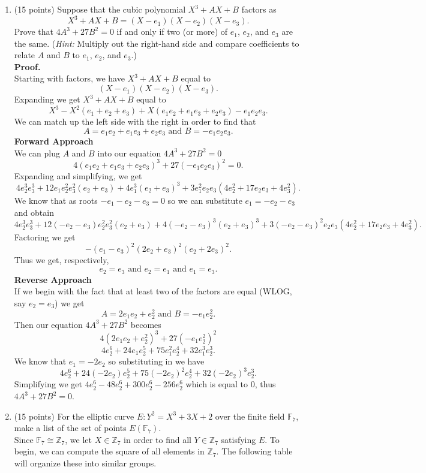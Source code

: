 \documentclass[12pt]{article}
\begin{document}
\begin{enumerate}
\item (15 points)
Suppose that the cubic polynomial $X^3+AX+B$ factors as 
\[X^3+AX+B=(X-e_1)(X-e_2)(X-e_3).\]
Prove that $4A^3+27B^2=0$ if and only if  two (or more) of $e_1$, $e_2$, and $e_3$ are the same. (\emph{Hint:} Multiply out the right-hand side and compare coefficients to relate $A$ and $B$ to $e_1$, $e_2$, and $e_3$.)\\

\textbf{Proof.}\\
Starting with factors, we have $X^3+AX+B$ equal to \[(X-e_1)(X-e_2)(X-e_3).\]
Expanding we get $X^3+AX+B$ equal to \[X^3-X^2(e_1 + e_2 +e_3)+X(e_1e_2+e_1e_3+e_2e_3)-e_1e_2e_3.\]
We can match up the left side with the right in order to find that \[A = e_1e_2+e_1e_3+e_2e_3 \text{ and } B = -e_1e_2e_3.\]
\textbf{Forward Approach}\\
We can plug $A$ and $B$ into our equation $4A^3+27B^2=0$\[4(e_1e_2+e_1e_3+e_2e_3)^3+27(-e_1e_2e_3)^2=0.\] 
Expanding and simplifying, we get \[4e_2^3e_3^3 + 12e_1e_2^2e_3^2(e_2 + e_3) + 4e_1^3(e_2 + e_3)^3 + 3e_1^2e_2e_3(4e_2^2 + 17e_2e_3 + 4e_3^2).\] 
We know that as roots $-e_1-e_2-e_3=0$ so we can substitute $e_1=-e_2-e_3$ and obtain \[4e_2^3e_3^3 + 12(-e_2-e_3)e_2^2e_3^2(e_2 + e_3) + 4(-e_2-e_3)^3(e_2 + e_3)^3 + 3(-e_2-e_3)^2e_2e_3(4e_2^2 + 17e_2e_3 + 4e_3^2).\]
Factoring we get \[-(e_1-e_3)^2(2e_2+e_3)^2(e_2+2e_3)^2.\]
Thus we get, respectively, \[e_2=e_3 \text{ and } e_2=e_1 \text{ and } e_1=e_3.\]
\textbf{Reverse Approach}\\
If we begin with the fact that at least two of the factors are equal
(WLOG, say $e_2=e_3$) we get \[A=2e_1e_2+e_2^2 \text{ and } B=-e_1e_2^2.\]
Then our equation $4A^3+27B^2$ becomes \[4(2e_1e_2+e_2^2)^3+27(-e_1e_2^2)^2\]
\[4 e_2^6 + 24 e_1 e_2^5 + 75 e_1^2 e_2^4 + 32 e_1^3 e_2^3.\]
We know that $e_1=-2e_2$ so substituting in we have
\[4 e_2^6 + 24(-2e_2) e_2^5 + 75 (-2e_2)^2 e_2^4 + 32 (-2e_2)^3 e_2^3.\]
Simplifying we get $4 e_2^6 -48e_2^6 +300e_2^6 - 256e_2^6$ which is equal to $0$, thus $4A^3+27B^2=0$.






\item (15 points)
For the elliptic curve $E\colon Y^2=X^3+3X+2$ over the finite field $\mathbb{F}_7$, make a list of the set of points 
$E(\mathbb{F}_7)$.\\

Since $\mathbb{F}_7 \cong \mathbb{Z}_7$, we let $X \in \mathbb{Z}_7$ in order to find all $Y \in \mathbb{Z}_7$ satisfying $E$. To begin, we can compute the square of all elements in $\mathbb{Z}_7$. The following table will organize these into similar groups.


\end{enumerate}
\end{document}
